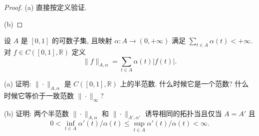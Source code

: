 \begin{proof}
    (a) 直接按定义验证.

    (b) 
\end{proof}



\begin{exercise}
    设 $A$ 是 $[0,1]$ 的可数子集, 且映射 $\alpha: A \rightarrow(0,+\infty)$ 
    满足 $\sum_{t\in A}\alpha(t)<+\infty$. 对 $f\in C([0,1],\mathbb{R})$ 定义
    \[
    \|f\|_{A,\alpha}=\sum_{t\in A}\alpha(t)|f(t)|.
    \]

    (a) 证明: $\|\cdot\|_{A,\alpha}$ 是 $C([0,1],\mathbb{R})$ 上的半范数. 什么时候它是一个范数? 
    什么时候它等价于一致范数 $\|\cdot\|_{\infty}$?

    (b) 证明: 两个半范数 $\|\cdot\|_{A, \alpha}$ 和 $\|\cdot\|_{A',\alpha'}$ 诱导相同的拓扑当且仅当 $A=A'$ 且
    \[
    0<\inf_{t\in A} \alpha'(t)/\alpha(t)\leqslant \sup_{t\in A} \alpha'(t)/\alpha(t)<\infty.
    \]
\end{exercise}

